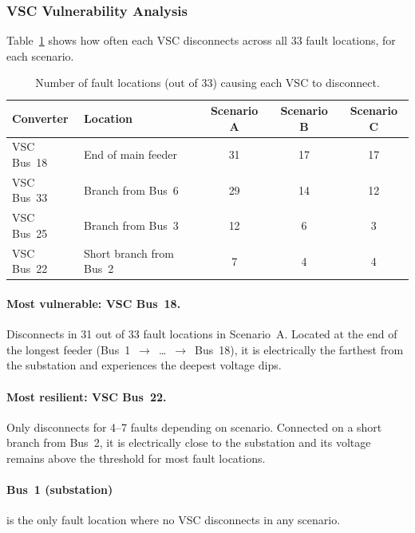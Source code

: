 \subsubsection{VSC Vulnerability Analysis}

Table~\ref{tab:vsc_vulnerability} shows how often each VSC disconnects across all 33 fault locations, for each scenario.

\begin{table}[htbp]
    \centering
    \caption{Number of fault locations (out of 33) causing each VSC to disconnect.}
    \label{tab:vsc_vulnerability}
    \begin{tabular}{llccc}
        \toprule
        \textbf{Converter} & \textbf{Location} & \textbf{Scenario A} & \textbf{Scenario B} & \textbf{Scenario C} \\
        \midrule
        VSC Bus~18 & End of main feeder     & 31 & 17 & 17 \\
        VSC Bus~33 & Branch from Bus~6      & 29 & 14 & 12 \\
        VSC Bus~25 & Branch from Bus~3      & 12 &  6 &  3 \\
        VSC Bus~22 & Short branch from Bus~2 &  7 &  4 &  4 \\
        \bottomrule
    \end{tabular}
\end{table}

\paragraph{Most vulnerable: VSC Bus~18.}
Disconnects in 31 out of 33 fault locations in Scenario~A. Located at the end of the longest feeder (Bus~1~$\to$~\ldots~$\to$~Bus~18), it is electrically the farthest from the substation and experiences the deepest voltage dips.

\paragraph{Most resilient: VSC Bus~22.}
Only disconnects for 4--7 faults depending on scenario. Connected on a short branch from Bus~2, it is electrically close to the substation and its voltage remains above the threshold for most fault locations.

\paragraph{Bus~1 (substation)} is the only fault location where no VSC disconnects in any scenario.


